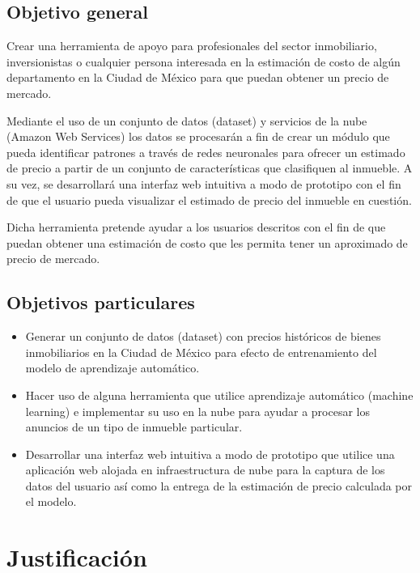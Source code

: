 \subsection{Objetivo general}

Crear una herramienta de apoyo para profesionales del sector inmobiliario,
inversionistas o cualquier persona interesada en la estimación de costo de algún
departamento en la Ciudad de México para que puedan obtener un precio de mercado.

Mediante el uso de un conjunto de datos (\gls{dataset}) y servicios de la nube (Amazon
Web Services) los datos se procesarán a fin de crear un módulo que pueda identificar
patrones a través de redes neuronales para ofrecer un estimado de precio a partir
de un conjunto de características que clasifiquen al inmueble. A su vez, se
desarrollará una interfaz web intuitiva a modo de prototipo con el fin de que el
usuario pueda visualizar el estimado de precio del inmueble en cuestión.

Dicha herramienta pretende ayudar a los usuarios descritos con el fin de que
puedan obtener una estimación de costo que les permita tener un aproximado de
precio de mercado.

\subsection{Objetivos particulares}

\begin{itemize}
  \item Generar un conjunto de datos (\gls{dataset}) con precios históricos de bienes
  inmobiliarios en la Ciudad de México para efecto de entrenamiento del modelo
  de aprendizaje automático.
  \item Hacer uso de alguna herramienta que utilice aprendizaje automático
  (machine learning) e implementar su uso en la nube para ayudar a procesar los
  anuncios de un tipo de inmueble particular.
  \item Desarrollar una interfaz web intuitiva a modo de prototipo que utilice
  una aplicación web alojada en infraestructura de nube para la captura de los
  datos del usuario así como la entrega de la estimación de precio calculada
  por el modelo.
\end{itemize}

\section{Justificación}

